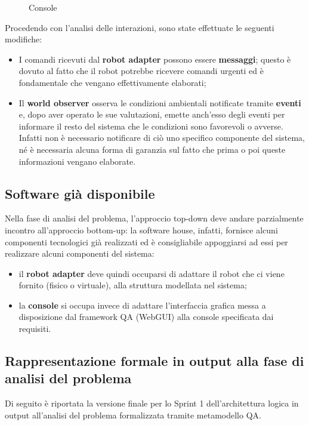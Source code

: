\begin{figure}[H]
  \centering
  \caption{Console}%
  \label{fig:sp1:prob:console}
\end{figure}

Procedendo con l'analisi delle interazioni, sono state effettuate le seguenti modifiche:
\begin{itemize}
    \item
      I comandi ricevuti dal \textbf{robot adapter} possono essere \textbf{messaggi};
      questo è dovuto al fatto che il robot potrebbe ricevere comandi urgenti ed è fondamentale che vengano effettivamente elaborati;
    \item
      Il \textbf{world observer} osserva le condizioni ambientali notificate tramite \textbf{eventi} e,
      dopo aver operato le sue valutazioni, emette anch'esso degli eventi per informare il resto del sistema che le condizioni sono favorevoli o avverse.
      Infatti non è necessario notificare di ciò uno specifico componente del sistema, né è necessaria alcuna forma di garanzia sul fatto che prima o poi queste informazioni vengano elaborate.
\end{itemize}

\subsection{Software già disponibile}

Nella fase di analisi del problema, l'approccio top-down deve andare parzialmente incontro all'approccio bottom-up:
la software house, infatti, fornisce alcuni componenti tecnologici già realizzati ed è consigliabile appoggiarsi ad essi per realizzare alcuni componenti del sistema:

\begin{itemize}
    \item il \textbf{robot adapter} deve quindi occuparsi di adattare il robot che ci viene fornito (fisico o virtuale), alla struttura modellata nel sistema;
    \item la \textbf{console} si occupa invece di adattare l'interfaccia grafica messa a disposizione dal framework QA (WebGUI) alla console specificata dai requisiti.
\end{itemize}

\subsection[Rappresentazione formale]{Rappresentazione formale in output alla fase di analisi del problema}

Di seguito è riportata la versione finale per lo Sprint 1 dell'architettura logica in output all'analisi del problema formalizzata tramite metamodello QA\@.


